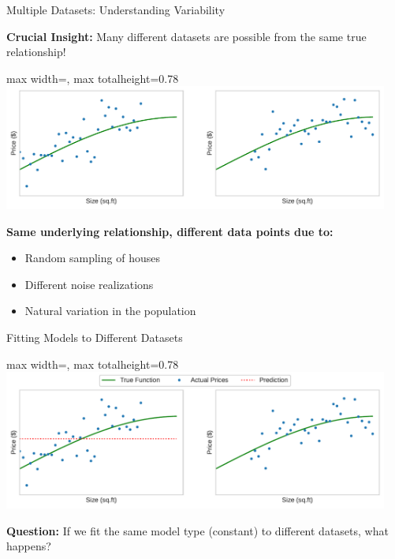 \documentclass[10pt]{beamer}
\newcommand{\fitpic}[1]{\begin{adjustbox}{max width=\linewidth, max totalheight=0.78\textheight}#1\end{adjustbox}}
\begin{document}
\begin{frame}{Multiple Datasets: Understanding Variability}
\begin{keypointsbox}
\textbf{Crucial Insight:} Many different datasets are possible from the same true relationship!
\end{keypointsbox}

\begin{center}
\fitpic{\includegraphics[width=0.95\textwidth]{../assets/bias-variance/figures/bias1.pdf}}
\end{center}

\begin{examplebox}
\textbf{Same underlying relationship, different data points due to:}
\begin{itemize}
\item Random sampling of houses
\item Different noise realizations
\item Natural variation in the population
\end{itemize}
\end{examplebox}
\end{frame}

\begin{frame}{Fitting Models to Different Datasets}
\begin{center}
\fitpic{\includegraphics[width=0.95\textwidth]{../assets/bias-variance/figures/bias2.pdf}}
\end{center}

\begin{keypointsbox}
\textbf{Question:} If we fit the same model type (constant) to different datasets, what happens?
\end{keypointsbox}
\end{frame}
\end{document}
